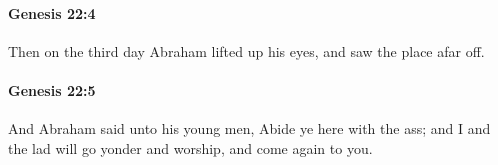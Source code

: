 		\paragraph{Genesis 22:4} %
			\label{GENESIS-22-4}

			Then on the third day Abraham lifted up his eyes, and saw the place afar off.


		\paragraph{Genesis 22:5} %
			\label{GENESIS-22-5}

			And Abraham said unto his young men, Abide ye here with the ass; and I and the lad will go yonder and worship, and come again to you.


